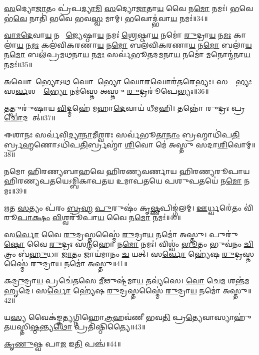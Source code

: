 \ul{𑌸}𑌦𑍍𑌯𑍋\ul{𑌜𑌾}𑌤𑌂 𑌪𑍍𑌰॑𑌪\ul{𑌦𑍍𑌯𑌾}\ul{𑌮𑌿} \ul{𑌸}𑌦𑍍𑌯𑍋\ul{𑌜𑌾}𑌤𑌾\ul{𑌯} 𑌵𑍈 𑌨\ul{𑌮𑍋} 𑌨𑌮𑌃॑। 
\ul{𑌭}𑌵𑍇 𑌭॑\ul{𑌵𑍇} 𑌨𑌾𑌤𑌿॑ 𑌭𑌵𑍇 𑌭𑌵\ul{𑌸𑍍𑌵} 𑌮𑌾𑌮𑍍। 
\ul{𑌭}𑌵𑍋𑌦𑍍𑌭॑𑌵𑌾\ul{𑌯} 𑌨𑌮𑌃॑॥34॥
\anuvakamend

\ul{𑌵𑌾}\ul{𑌮}\ul{𑌦𑍇}𑌵𑌾\ul{𑌯} 𑌨𑌮𑍋᳚ \ul{𑌜𑍍𑌯𑍇}𑌷𑍍𑌠𑌾\ul{𑌯} 𑌨𑌮𑌃॑ \ul{𑌶𑍍𑌰𑍇}𑌷𑍍𑌠𑌾\ul{𑌯} 𑌨𑌮𑍋॑ \ul{𑌰𑍁}𑌦𑍍𑌰𑌾\ul{𑌯} 𑌨\ul{𑌮𑌃} 𑌕𑌾𑌲𑌾॑\ul{𑌯} 𑌨\ul{𑌮𑌃} 𑌕𑌲॑𑌵𑌿𑌕𑌰𑌣𑌾\ul{𑌯} 𑌨\ul{𑌮𑍋} 𑌬𑌲॑𑌵𑌿𑌕𑌰𑌣𑌾\ul{𑌯} 𑌨\ul{𑌮𑍋} 𑌬𑌲𑌾॑\ul{𑌯} 𑌨\ul{𑌮𑍋} 𑌬𑌲॑𑌪𑍍𑌰𑌮𑌥𑌨𑌾\ul{𑌯} 𑌨\ul{𑌮𑌃} 𑌸𑌰𑍍𑌵॑𑌭𑍂𑌤𑌦𑌮𑌨𑌾\ul{𑌯} 𑌨𑌮𑍋॑ \ul{𑌮}𑌨𑍋𑌨𑍍𑌮॑𑌨𑌾\ul{𑌯} 𑌨𑌮𑌃॑॥35॥\anuvakamend

\ul{𑌅}𑌘𑍋𑌰𑍇᳚𑌭𑍍𑌯𑍋𑌽\ul{𑌥} 𑌘𑍋𑌰𑍇᳚\ul{𑌭𑍍𑌯𑍋} 𑌘𑍋\ul{𑌰}𑌘𑍋𑌰॑𑌤𑌰𑍇𑌭𑍍𑌯𑌃। 
𑌸𑌰𑍍𑌵𑍇᳚𑌭𑍍𑌯𑌃 𑌸\ul{𑌰𑍍𑌵}𑌶𑌰𑍍𑌵𑍇᳚\ul{𑌭𑍍𑌯𑍋} 𑌨𑌮॑𑌸𑍍𑌤𑍇 𑌅𑌸𑍍𑌤𑍁 \ul{𑌰𑍁}𑌦𑍍𑌰𑌰𑍂॑𑌪𑍇𑌭𑍍𑌯𑌃॥36॥
\anuvakamend

𑌤𑌤𑍍𑌪𑍁𑌰𑍁॑𑌷𑌾𑌯 \ul{𑌵𑌿}𑌦𑍍𑌮𑌹𑍇॑ 𑌮𑌹𑌾\ul{𑌦𑍇}𑌵𑌾𑌯॑ 𑌧𑍀𑌮𑌹𑌿। 
𑌤𑌨𑍍𑌨𑍋॑ 𑌰𑍁𑌦𑍍𑌰𑌃 𑌪𑍍𑌰\ul{𑌚𑍋}𑌦𑌯𑌾᳚𑌤𑍍॥37॥
\anuvakamend

𑌈𑌶𑌾𑌨𑌃 𑌸𑌰𑍍𑌵॑𑌵𑌿\ul{𑌦𑍍𑌯𑌾}\ul{𑌨𑌾}𑌮𑍀𑌶𑍍𑌵𑌰𑌃 𑌸𑌰𑍍𑌵॑𑌭𑍂\ul{𑌤𑌾}\ul{𑌨𑌾𑌂} 𑌬𑍍𑌰𑌹𑍍𑌮𑌾𑌧𑌿॑𑌪\ul{𑌤𑌿}𑌰𑍍𑌬𑍍𑌰\ul{𑌹𑍍𑌮}𑌣𑍋\-𑌽𑌧𑌿॑𑌪\ul{𑌤𑌿}𑌰𑍍𑌬𑍍𑌰𑌹𑍍𑌮𑌾॑ \ul{𑌶𑌿}𑌵𑍋 𑌮𑍇॑ 𑌅𑌸𑍍𑌤𑍁 𑌸𑌦𑌾\ul{𑌶𑌿}𑌵𑍋𑌮𑍍॥38॥
\anuvakamend

𑌨𑌮𑍋 𑌹𑌿𑌰𑌣𑍍𑌯𑌬𑌾𑌹𑌵𑍇 𑌹𑌿𑌰𑌣𑍍𑌯𑌵𑌰𑍍𑌣𑌾𑌯 𑌹𑌿𑌰𑌣𑍍𑌯𑌰𑍂𑌪𑌾𑌯 𑌹𑌿𑌰𑌣𑍍𑌯𑌪𑌤𑌯𑍇\-𑌽𑌮𑍍𑌬𑌿𑌕𑌾𑌪𑌤𑌯 𑌉𑌮𑌾𑌪𑌤𑌯𑍇 𑌪𑌶𑍁𑌪𑌤𑌯𑍇॑ 𑌨\ul{𑌮𑍋} 𑌨𑌮𑌃॥39॥
\anuvakamend

\ul{𑌋}𑌤 \ul{𑌸}𑌤𑍍𑌯𑌂 𑌪॑𑌰𑌂 \ul{𑌬𑍍𑌰}\ul{𑌹𑍍𑌮} \ul{𑌪𑍁}𑌰𑍁𑌷𑌂॑ 𑌕𑍃\ul{𑌷𑍍𑌣}𑌪𑌿𑌙𑍍𑌗॑𑌲𑌮𑍍। 
\ul{𑌊}𑌰𑍍𑌧𑍍𑌵𑌰𑍇॑𑌤𑌂 𑌵𑌿॑𑌰𑍂\ul{𑌪𑌾}\ul{𑌕𑍍𑌷𑌂} \ul{𑌵𑌿}𑌶𑍍𑌵𑌰𑍂॑𑌪𑌾\ul{𑌯} 𑌵𑍈 𑌨\ul{𑌮𑍋} 𑌨𑌮𑌃॑॥40॥
\anuvakamend

𑌸\ul{𑌰𑍍𑌵𑍋} 𑌵𑍈 \ul{𑌰𑍁}𑌦𑍍𑌰𑌸𑍍𑌤𑌸𑍍𑌮𑍈॑ \ul{𑌰𑍁}𑌦𑍍𑌰𑌾\ul{𑌯} 𑌨𑌮𑍋॑ 𑌅𑌸𑍍𑌤𑍁। 
𑌪𑍁𑌰𑍁॑\ul{𑌷𑍋} 𑌵𑍈 \ul{𑌰𑍁}𑌦𑍍𑌰𑌃 𑌸\ul{𑌨𑍍𑌮}𑌹𑍋 𑌨\ul{𑌮𑍋} 𑌨𑌮𑌃॑। 
𑌵𑌿𑌶𑍍𑌵𑌂॑ \ul{𑌭𑍂}𑌤𑌂 𑌭𑍁𑌵॑𑌨𑌂 \ul{𑌚𑌿}𑌤𑍍𑌰𑌂 𑌬॑\ul{𑌹𑍁}𑌧𑌾 \ul{𑌜𑌾}𑌤𑌂 𑌜𑌾𑌯॑𑌮𑌾𑌨𑌂 \ul{𑌚} 𑌯𑌤𑍍। 
𑌸\ul{𑌰𑍍𑌵𑍋} 𑌹𑍍𑌯𑍇॑𑌷 \ul{𑌰𑍁}𑌦𑍍𑌰𑌸𑍍𑌤𑌸𑍍𑌮𑍈॑ \ul{𑌰𑍁}𑌦𑍍𑌰𑌾\ul{𑌯} 𑌨𑌮𑍋॑ 𑌅𑌸𑍍𑌤𑍁॥41॥
\anuvakamend


𑌕\ul{𑌦𑍍𑌰𑍁}𑌦𑍍𑌰𑌾\ul{𑌯} 𑌪𑍍𑌰𑌚𑍇॑𑌤𑌸𑍇 \ul{𑌮𑍀}𑌢𑍁𑌷𑍍𑌟॑𑌮𑌾\ul{𑌯} 𑌤𑌵𑍍𑌯॑𑌸𑍇। 
\ul{𑌵𑍋} 𑌚𑍇\ul{𑌮} 𑌶𑌨𑍍𑌤॑𑌮 \ul{𑌹𑍃}𑌦𑍇। 
𑌸\ul{𑌰𑍍𑌵𑍋} 𑌹𑍍𑌯𑍇॑𑌷 \ul{𑌰𑍁}𑌦𑍍𑌰𑌸𑍍𑌤𑌸𑍍𑌮𑍈॑ \ul{𑌰𑍁}𑌦𑍍𑌰𑌾\ul{𑌯} 𑌨𑌮𑍋॑ 𑌅𑌸𑍍𑌤𑍁॥42॥
\anuvakamend

𑌯\ul{𑌸𑍍𑌯} 𑌵𑍈𑌕॑𑌙𑍍𑌕𑌤𑍍𑌯𑌗𑍍𑌨𑌿𑌹𑍋\ul{𑌤𑍍𑌰}𑌹𑌵॑𑌣𑍀 𑌭𑌵\ul{𑌤𑌿} 𑌪𑍍𑌰\ul{𑌤𑍍𑌯𑍇}𑌵𑌾𑌸𑍍𑌯𑌾𑌹𑍁॑𑌤𑌯\-𑌸𑍍𑌤𑌿\ul{𑌷𑍍𑌠}𑌨𑍍𑌤𑍍𑌯\ul{𑌥𑍋} 𑌪𑍍𑌰𑌤𑌿॑𑌷𑍍𑌠𑌿𑌤𑍍𑌯𑍈॥43॥
\anuvakamend


\ul{𑌕𑍃}\ul{𑌣𑍁}𑌷𑍍𑌵 𑌪𑌾\ul{𑌜} 𑌇\ul{𑌤𑌿} 𑌪𑌞𑍍𑌚॑॥44॥
\anuvakamend

